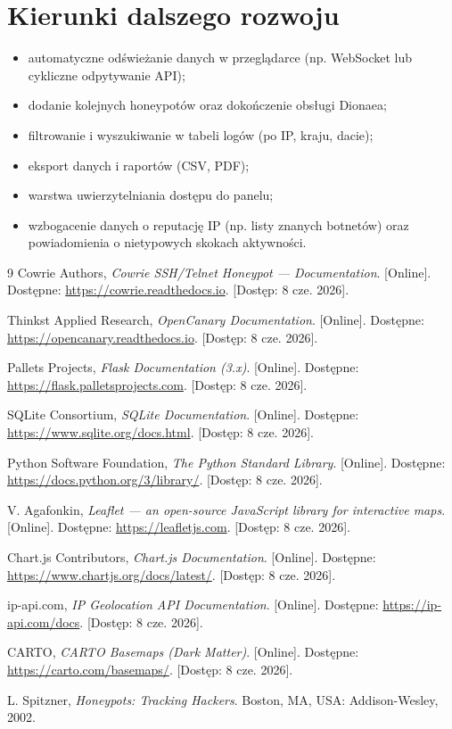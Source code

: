 \documentclass[12pt,a4paper]{report}
\begin{document}
\section{Kierunki dalszego rozwoju}

\begin{itemize}
  \item automatyczne odświeżanie danych w przeglądarce (np. WebSocket lub
        cykliczne odpytywanie API);
  \item dodanie kolejnych honeypotów oraz dokończenie obsługi Dionaea;
  \item filtrowanie i wyszukiwanie w tabeli logów (po IP, kraju, dacie);
  \item eksport danych i raportów (CSV, PDF);
  \item warstwa uwierzytelniania dostępu do panelu;
  \item wzbogacenie danych o reputację IP (np. listy znanych botnetów)
        oraz powiadomienia o nietypowych skokach aktywności.
\end{itemize}

\begin{thebibliography}{9}
Cowrie Authors, \emph{Cowrie SSH/Telnet Honeypot --- Documentation}. [Online].
Dostępne: \url{https://cowrie.readthedocs.io}. [Dostęp: 8 cze. 2026].

Thinkst Applied Research, \emph{OpenCanary Documentation}. [Online].
Dostępne: \url{https://opencanary.readthedocs.io}. [Dostęp: 8 cze. 2026].

Pallets Projects, \emph{Flask Documentation (3.x)}. [Online].
Dostępne: \url{https://flask.palletsprojects.com}. [Dostęp: 8 cze. 2026].

SQLite Consortium, \emph{SQLite Documentation}. [Online].
Dostępne: \url{https://www.sqlite.org/docs.html}. [Dostęp: 8 cze. 2026].

Python Software Foundation, \emph{The Python Standard Library}. [Online].
Dostępne: \url{https://docs.python.org/3/library/}. [Dostęp: 8 cze. 2026].

V. Agafonkin, \emph{Leaflet --- an open-source JavaScript library for
interactive maps}. [Online]. Dostępne: \url{https://leafletjs.com}.
[Dostęp: 8 cze. 2026].

Chart.js Contributors, \emph{Chart.js Documentation}. [Online].
Dostępne: \url{https://www.chartjs.org/docs/latest/}. [Dostęp: 8 cze. 2026].

ip-api.com, \emph{IP Geolocation API Documentation}. [Online].
Dostępne: \url{https://ip-api.com/docs}. [Dostęp: 8 cze. 2026].

CARTO, \emph{CARTO Basemaps (Dark Matter)}. [Online].
Dostępne: \url{https://carto.com/basemaps/}. [Dostęp: 8 cze. 2026].

L. Spitzner, \emph{Honeypots: Tracking Hackers}. Boston, MA, USA:
Addison-Wesley, 2002.
\end{thebibliography}
\end{document}
